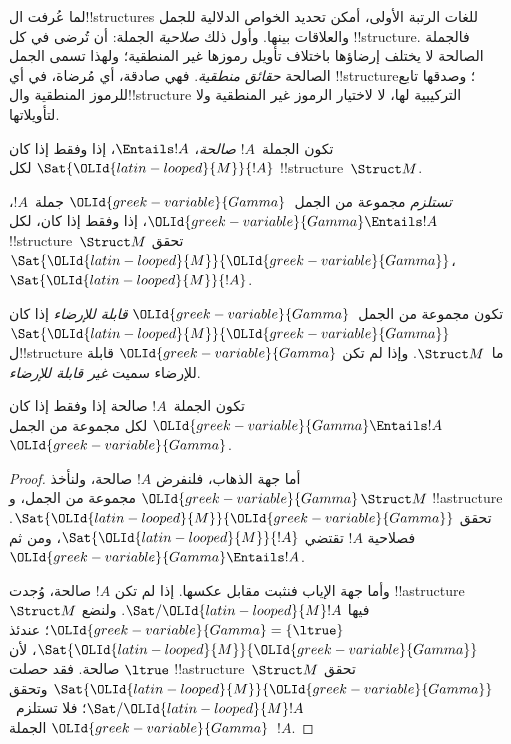 \documentclass[../../../include/open-logic-section]{subfiles}
\begin{document}

\begin{explain}
لما عُرفت ال!!{structure}s للغات الرتبة الأولى، أمكن تحديد
الخواص الدلالية للجمل والعلاقات بينها. وأول ذلك \emph{صلاحية}
الجملة: أن تُرضى في كل !!{structure}. فالجملة الصالحة لا يختلف
إرضاؤها باختلاف تأويل رموزها غير المنطقية؛ ولهذا تسمى الجمل
الصالحة \emph{حقائق منطقية}. فهي صادقة، أي مُرضاة، في أي
!!{structure}؛ وصدقها تابع للرموز المنطقية وال!!{structure}
التركيبية لها، لا لاختيار الرموز غير المنطقية ولا لتأويلاتها.
\end{explain}

\begin{defn}[الصلاحية]
تكون الجملة~$!A$ \emph{صالحة}، $\Entails !A$، إذا وفقط إذا كان
$\Sat{\OLId{latin-looped}{M}}{!A}$ لكل !!{structure}~$\Struct M$.
\end{defn}

\begin{defn}[الاستلزام]
\emph{تستلزم} مجموعة من الجمل~$\OLId{greek-variable}{Gamma}$ جملة~$!A$،
$\OLId{greek-variable}{Gamma} \Entails !A$، إذا وفقط إذا كان، لكل
!!{structure}~$\Struct M$ تحقق $\Sat{\OLId{latin-looped}{M}}{\OLId{greek-variable}{Gamma}}$،
$\Sat{\OLId{latin-looped}{M}}{!A}$.
\end{defn}


\begin{defn}
تكون مجموعة من الجمل~$\OLId{greek-variable}{Gamma}$ \emph{قابلة للإرضاء} إذا كان
$\Sat{\OLId{latin-looped}{M}}{\OLId{greek-variable}{Gamma}}$ ل!!{structure} ما~$\Struct M$. وإذا لم تكن
$\OLId{greek-variable}{Gamma}$ قابلة للإرضاء سميت \emph{غير قابلة للإرضاء}.
\end{defn}

\begin{prop}
تكون الجملة~$!A$ صالحة إذا وفقط إذا كان
$\OLId{greek-variable}{Gamma} \Entails !A$ لكل مجموعة من الجمل~$\OLId{greek-variable}{Gamma}$.
\end{prop}

\begin{proof}
أما جهة الذهاب، فلنفرض $!A$ صالحة، ولنأخذ $\OLId{greek-variable}{Gamma}$ مجموعة من
الجمل، و$\Struct M$ !!a{structure} تحقق
$\Sat{\OLId{latin-looped}{M}}{\OLId{greek-variable}{Gamma}}$. فصلاحية $!A$ تقتضي $\Sat{\OLId{latin-looped}{M}}{!A}$،
ومن ثم $\OLId{greek-variable}{Gamma} \Entails !A$.

وأما جهة الإياب فنثبت مقابل عكسها. إذا لم تكن $!A$ صالحة، وُجدت
!!a{structure}~$\Struct M$ فيها $\Sat/{\OLId{latin-looped}{M}}{!A}$. ولنضع
$\OLId{greek-variable}{Gamma} = \{ \ltrue \}$؛ عندئذ $\Sat{\OLId{latin-looped}{M}}{\OLId{greek-variable}{Gamma}}$، لأن
$\ltrue$ صالحة. فقد حصلت !!a{structure}~$\Struct M$ تحقق
$\Sat{\OLId{latin-looped}{M}}{\OLId{greek-variable}{Gamma}}$ وتحقق $\Sat/{\OLId{latin-looped}{M}}{!A}$؛ فلا تستلزم~$\OLId{greek-variable}{Gamma}$
الجملة~$!A$.
\end{proof}
\end{document}
